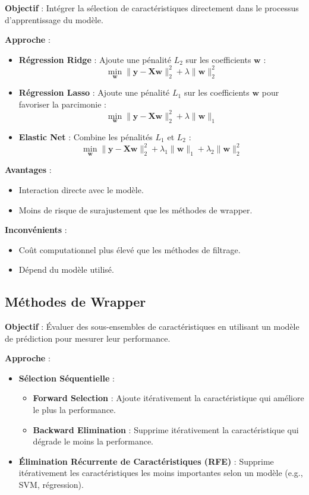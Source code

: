 \documentclass[a4paper,portrait]{article}
\begin{document}
\begin{multicols}{2}
\textbf{Objectif} : Intégrer la sélection de caractéristiques directement dans le processus d'apprentissage du modèle.

\textbf{Approche} :
\begin{itemize}
    \item \textbf{Régression Ridge} : Ajoute une pénalité \( L_2 \) sur les coefficients \( \mathbf{w} \) :
    \[
    \min_{\mathbf{w}} \| \mathbf{y} - \mathbf{X} \mathbf{w} \|_2^2 + \lambda \| \mathbf{w} \|_2^2
    \]
    \item \textbf{Régression Lasso} : Ajoute une pénalité \( L_1 \) sur les coefficients \( \mathbf{w} \) pour favoriser la parcimonie :
    \[
    \min_{\mathbf{w}} \| \mathbf{y} - \mathbf{X} \mathbf{w} \|_2^2 + \lambda \| \mathbf{w} \|_1
    \]
    \item \textbf{Elastic Net} : Combine les pénalités \( L_1 \) et \( L_2 \) :
    \[
    \min_{\mathbf{w}} \| \mathbf{y} - \mathbf{X} \mathbf{w} \|_2^2 + \lambda_1 \| \mathbf{w} \|_1 + \lambda_2 \| \mathbf{w} \|_2^2
    \]
\end{itemize}

\textbf{Avantages} :
\begin{itemize}
    \item Interaction directe avec le modèle.
    \item Moins de risque de surajustement que les méthodes de wrapper.
\end{itemize}

\textbf{Inconvénients} :
\begin{itemize}
    \item Coût computationnel plus élevé que les méthodes de filtrage.
    \item Dépend du modèle utilisé.
\end{itemize}



\subsection{Méthodes de Wrapper}

\textbf{Objectif} : Évaluer des sous-ensembles de caractéristiques en utilisant un modèle de prédiction pour mesurer leur performance.

\textbf{Approche} :
\begin{itemize}
    \item \textbf{Sélection Séquentielle} :
    \begin{itemize}
        \item \textbf{Forward Selection} : Ajoute itérativement la caractéristique qui améliore le plus la performance.
        \item \textbf{Backward Elimination} : Supprime itérativement la caractéristique qui dégrade le moins la performance.
    \end{itemize}
    \item \textbf{Élimination Récurrente de Caractéristiques (RFE)} : Supprime itérativement les caractéristiques les moins importantes selon un modèle (e.g., SVM, régression).
\end{itemize}


\end{multicols}
\end{document}
